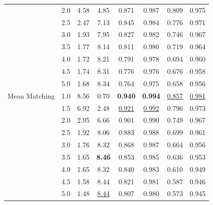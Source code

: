 \begin{table}[htbp]
\begin{tabular}{l|l|cccccc|}
 & 2.0 & 4.58 & 4.85 & 0.871 & 0.987 & 0.809 & 0.975 \\
 & 2.5 & 2.47 & 7.13 & 0.845 & 0.984 & 0.776 & 0.971 \\
 & 3.0 & 1.93 & 7.95 & 0.827 & 0.982 & 0.746 & 0.967 \\
 & 3.5 & 1.77 & 8.14 & 0.811 & 0.980 & 0.719 & 0.964 \\
 & 4.0 & 1.72 & 8.21 & 0.791 & 0.978 & 0.694 & 0.960 \\
 & 4.5 & 1.74 & 8.31 & 0.776 & 0.976 & 0.676 & 0.958 \\
 & 5.0 & 1.68 & 8.34 & 0.764 & 0.975 & 0.658 & 0.956 \\
\hline
Mean Matching & 1.0 & 8.56 & 0.70 & \textbf{0.940} & \textbf{0.994} & \underline{0.857} & \underline{0.981} \\
 & 1.5 & 6.92 & 2.48 & \underline{0.921} & \underline{0.992} & 0.796 & 0.973 \\
 & 2.0 & 2.95 & 6.66 & 0.901 & 0.990 & 0.749 & 0.967 \\
 & 2.5 & 1.92 & 8.06 & 0.883 & 0.988 & 0.699 & 0.961 \\
 & 3.0 & 1.76 & 8.32 & 0.868 & 0.987 & 0.664 & 0.956 \\
 & 3.5 & 1.65 & \textbf{8.46} & 0.853 & 0.985 & 0.636 & 0.953 \\
 & 4.0 & 1.65 & 8.32 & 0.840 & 0.983 & 0.610 & 0.949 \\
 & 4.5 & 1.58 & 8.44 & 0.821 & 0.981 & 0.587 & 0.946 \\
 & 5.0 & 1.48 & \underline{8.44} & 0.807 & 0.980 & 0.573 & 0.945 \\
\hline
\end{tabular}
\end{table}

